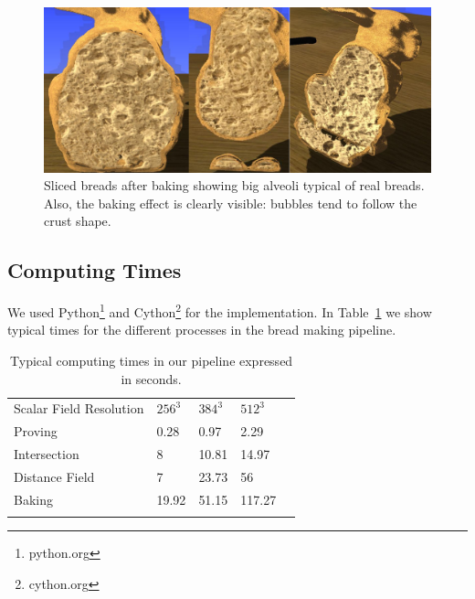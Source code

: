 \documentclass[spanish,a4paper,11pt,oneside,links]{report}
\begin{document}
\begin{figure}[!ht]
\begin{center}
\includegraphics[width=15cm]{figures/bakedbunny}
\caption{Sliced breads after baking showing big alveoli typical of real breads. Also, the baking effect is clearly visible: bubbles tend to follow the crust shape.}
\label{fg:bakedbunny}
\end{center}
\end{figure}



\subsection{Computing Times}
We used Python\footnote{python.org} and Cython\footnote{cython.org} for the implementation.
In Table~\ref{tab:computingtimes} we show typical times for the different processes in the bread making pipeline. %

\begin{table}[h!]
\begin{tabular}{lllll}
\hline\noalign{\smallskip}
Scalar Field Resolution & $256^{3}$ & $384^{3}$  & $512^{3}$ \\
\noalign{\smallskip}\hline\noalign{\smallskip}
Proving & 0.28 & 0.97 & 2.29 \\
Intersection & 8 & 10.81 & 14.97 \\
Distance Field & 7 & 23.73 & 56 \\
Baking & 19.92 & 51.15 & 117.27 \\
\noalign{\smallskip}\hline
\end{tabular}
\caption{Typical computing times in our pipeline expressed in seconds.}
\label{tab:computingtimes}
\end{table}
\end{document}
